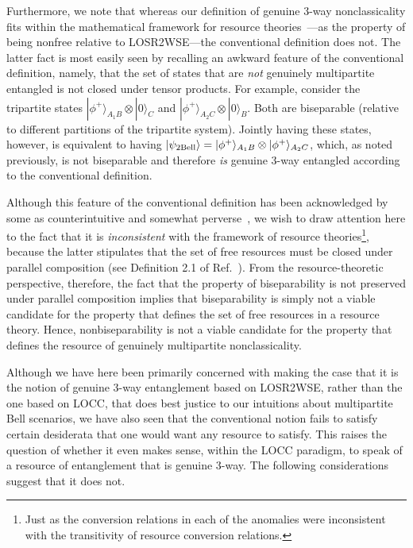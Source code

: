 \documentclass[prx,11pt,letterpaper,twocolumn,accepted=2023-11-27]{quantumarticle}
\theoremstyle{plain}
\theoremstyle{definition}
\begin{document}
Furthermore,
 we note that whereas our definition of genuine 3-way nonclassicality 
fits within the mathematical framework for resource theories~\cite{coecke2016mathematical}---as the property of being nonfree relative to LOSR2WSE---the conventional definition does not.  
The latter fact is most easily seen by recalling an awkward feature of the conventional definition,
namely, that the set of states that are {\em not} genuinely multipartite entangled is not closed under tensor products.  For example, consider the tripartite states $|\phi^{+}\rangle_{A_1B} \otimes |0\rangle_C$ and $|\phi^{+}\rangle_{A_2 C} \otimes |0\rangle_B$.  Both are biseparable (relative to different partitions of the tripartite system).  
Jointly having these states, however, is 
equivalent to having $|\psi_{\rm 2Bell}\rangle = |\phi^{+}\rangle_{A_1B} \otimes |\phi^{+}\rangle_{A_2 C}$, which, as noted previously, is not biseparable 
   and therefore {\em is} genuine 3-way entangled according to the conventional definition.  

Although this feature of the conventional definition has been acknowledged by some as counterintuitive and somewhat perverse~\cite{navascues2020genuine,contreras2021,MultipartiteProblem2020Luo}, we wish to draw attention here to the fact that it is {\em inconsistent} with the framework of resource theories\footnote{Just as the conversion relations in each of the anomalies were inconsistent with the transitivity of resource conversion relations.}, because the latter 
 stipulates that the set of free resources must be closed under parallel composition (see Definition 2.1 of Ref.~\cite{coecke2016mathematical}). From the resource-theoretic perspective, therefore, the fact that the property of biseparability is not preserved under parallel composition
  implies that biseparability is simply not a viable candidate for the property that defines the set of free resources in a resource theory. Hence, %
 nonbiseparability is not a viable candidate for the property that defines 
 the resource of genuinely multipartite nonclassicality.
 
Although we have here been primarily concerned with making the case that it is the notion of genuine 3-way entanglement based on  LOSR2WSE, rather than the one based on LOCC, that does best justice to our intuitions about multipartite Bell scenarios,
 we have also seen that the conventional notion fails to satisfy certain desiderata that one would want any resource to satisfy.  This raises the question of whether it even makes sense,  within the LOCC paradigm, to speak of a resource of entanglement that is genuine 3-way.  The following considerations suggest that it does not.
\end{document}
